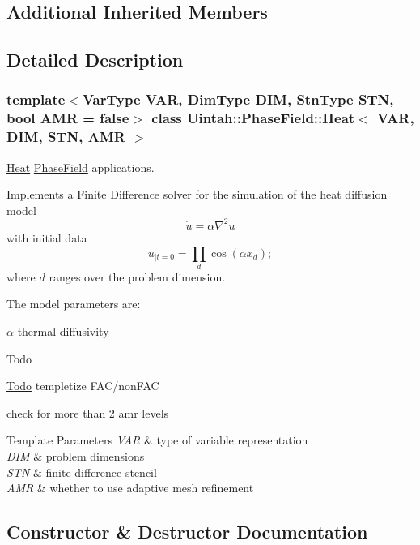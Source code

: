 \subsection*{Additional Inherited Members}


\subsection{Detailed Description}
\subsubsection*{template$<$Var\+Type V\+AR, Dim\+Type D\+IM, Stn\+Type S\+TN, bool A\+MR = false$>$\newline
class Uintah\+::\+Phase\+Field\+::\+Heat$<$ V\+A\+R, D\+I\+M, S\+T\+N, A\+M\+R $>$}

\hyperlink{classUintah_1_1PhaseField_1_1Heat}{Heat} \hyperlink{namespaceUintah_1_1PhaseField}{Phase\+Field} applications. 

Implements a Finite Difference solver for the simulation of the heat diffusion model \[ \dot u = \alpha \nabla^2 u \] with initial data \[ u_{|t=0} = \prod_{d} \cos ( \alpha x_d ); \] where $d$ ranges over the problem dimension.

The model parameters are\+:
\begin{DoxyItemize}
\item $ \alpha $ thermal diffusivity
\end{DoxyItemize}

\begin{DoxyRefDesc}{Todo}
\item[\hyperlink{todo__todo000006}{Todo}]templetize F\+A\+C/non\+F\+AC 

check for more than 2 amr levels\end{DoxyRefDesc}



\begin{DoxyTemplParams}{Template Parameters}
{\em V\+AR} & type of variable representation \\
\hline
{\em D\+IM} & problem dimensions \\
\hline
{\em S\+TN} & finite-\/difference stencil \\
\hline
{\em A\+MR} & whether to use adaptive mesh refinement \\
\hline
\end{DoxyTemplParams}


\subsection{Constructor \& Destructor Documentation}
\mbox{\label{classUintah_1_1PhaseField_1_1Heat_a034a847cbfa1066a8d3b31227916f659}} 

